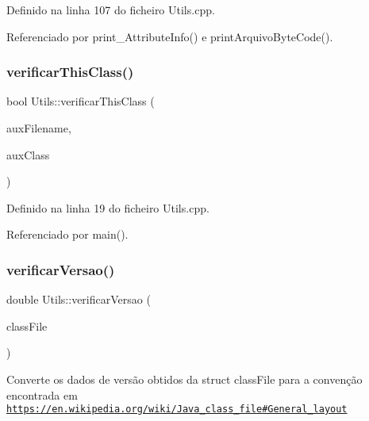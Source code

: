 Definido na linha 107 do ficheiro Utils.\+cpp.



Referenciado por print\+\_\+\+Attribute\+Info() e print\+Arquivo\+Byte\+Code().

\mbox{\label{classUtils_aa70b3d26f8b094e4bb4bbf3e05a6bd63}} 
\subsubsection{\texorpdfstring{verificar\+This\+Class()}{verificarThisClass()}}
{\footnotesize\ttfamily bool Utils\+::verificar\+This\+Class (\begin{DoxyParamCaption}\item[{string}]{aux\+Filename,  }\item[{string}]{aux\+Class }\end{DoxyParamCaption})\hspace{0.3cm}{\ttfamily [static]}}



Definido na linha 19 do ficheiro Utils.\+cpp.



Referenciado por main().

\mbox{\label{classUtils_a234dd450e6192a9ddbcd7e68e9a09841}} 
\subsubsection{\texorpdfstring{verificar\+Versao()}{verificarVersao()}}
{\footnotesize\ttfamily double Utils\+::verificar\+Versao (\begin{DoxyParamCaption}\item[{\hyperlink{classClassFile}{Class\+File} $\ast$}]{class\+File }\end{DoxyParamCaption})\hspace{0.3cm}{\ttfamily [static]}}

Converte os dados de versão obtidos da struct class\+File para a convenção encontrada em \href{https://en.wikipedia.org/wiki/Java_class_file#General_layout}{\tt https\+://en.\+wikipedia.\+org/wiki/\+Java\+\_\+class\+\_\+file\#\+General\+\_\+layout}

